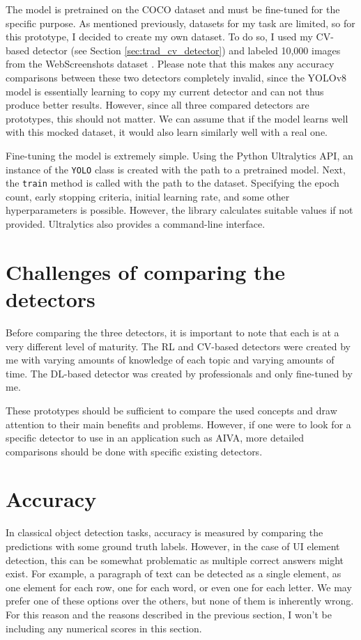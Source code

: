 \documentclass[
  digital,     %
  oneside,     %
  nosansbold,  %
  nocolorbold, %
  lof,         %
  lot,         %
]{fithesis4}
\begin{document}
The model is pretrained on the COCO dataset \cite{COCO} and must be fine-tuned for the specific purpose. As mentioned previously, datasets for my task are limited, so for this prototype, I decided to create my own dataset. To do so, I used my CV-based detector (see Section \ref{sec:trad_cv_detector}) and labeled 10,000 images from the WebScreenshots dataset \cite{aydos2020}. Please note that this makes any accuracy comparisons between these two detectors completely invalid, since the YOLOv8 model is essentially learning to copy my current detector and can not thus produce better results. However, since all three compared detectors are prototypes, this should not matter. We can assume that if the model learns well with this mocked dataset, it would also learn similarly well with a real one.

Fine-tuning the model is extremely simple. Using the Python Ultralytics API, an instance of the \texttt{YOLO} class is created with the path to a pretrained model. Next, the \texttt{train} method is called with the path to the dataset. Specifying the epoch count, early stopping criteria, initial learning rate, and some other hyperparameters is possible. However, the library calculates suitable values if not provided. Ultralytics also provides a command-line interface.

\section{Challenges of comparing the detectors}

Before comparing the three detectors, it is important to note that each is at a very different level of maturity. The RL and CV-based detectors were created by me with varying amounts of knowledge of each topic and varying amounts of time. The DL-based detector was created by professionals and only fine-tuned by me.

These prototypes should be sufficient to compare the used concepts and draw attention to their main benefits and problems. However, if one were to look for a specific detector to use in an application such as AIVA, more detailed comparisons should be done with specific existing detectors.

\section{Accuracy}

In classical object detection tasks, accuracy is measured by comparing the predictions with some ground truth labels. However, in the case of UI element detection, this can be somewhat problematic as multiple correct answers might exist. For example, a paragraph of text can be detected as a single element, as one element for each row, one for each word, or even one for each letter. We may prefer one of these options over the others, but none of them is inherently wrong. For this reason and the reasons described in the previous section, I won't be including any numerical scores in this section.
\end{document}
